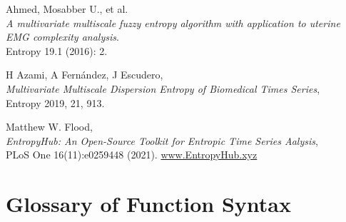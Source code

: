\documentclass[12pt, a4paper, titlepage, openany]{book}
\newcommand\chapterimage[2][]{%
  \AddToShipoutPictureBG*{%
    \AtTextUpperLeft{%
     \hspace*{\textwidth}%
      \llap{%
            \texttt{[image: \#2]}}}}}%
\begin{document}
\begin{thebibliography}{9}
Ahmed, Mosabber U., et al. \\
\emph{A multivariate multiscale fuzzy entropy algorithm with application to uterine EMG complexity analysis}. \\
Entropy 19.1 (2016): 2.

H Azami, A Fernández, J Escudero, \\
\emph{Multivariate Multiscale Dispersion Entropy of Biomedical Times Series},\\
Entropy 2019, 21, 913.




Matthew W. Flood,\\
\emph{EntropyHub: An Open-Source Toolkit for Entropic Time Series Aalysis},\\
PLoS One 16(11):e0259448 (2021).
\href{www.EntropyHub.xyz}{www.EntropyHub.xyz}

\end{thebibliography}






\newpage
\chapter{\textbf{Glossary of Function Syntax}}
\chapterimage[width=16cm, height=3cm]{Chapter Banner2.png}
\vspace{25mm}
\end{document}
